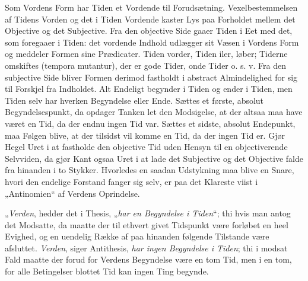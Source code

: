 \documentclass[12pt,a4paper]{book}
\begin{document}
Som Vordens Form har Tiden et Vordende til Forudsætning.
Vexelbestemmelsen af Tidens Vorden og det i Tiden Vordende kaster Lys
paa Forholdet mellem det Objective og det Subjective. Fra den
objective Side gaaer Tiden i Eet med det, som foregaaer i Tiden: det
vordende Indhold udlægger sit Væsen i Vordens Form og meddeler Formen
sine Prædicater. Tiden vorder, Tiden iler, løber; Tiderne omskiftes
(tempora mutantur), der er gode Tider, onde Tider o. s. v. Fra den
subjective Side bliver Formen derimod fastholdt i abstract
Almindelighed for sig til Forskjel fra Indholdet. Alt Endeligt
begynder i Tiden og ender i Tiden, men Tiden selv har hverken
Begyndelse eller Ende. Sættes et første, absolut Begyndelsespunkt, da
opdager Tanken let den Modsigelse, at der altsaa maa have været en Tid,
da der endnu ingen Tid var. Sættes et sidste, absolut Endepunkt, maa
Følgen blive, at der tilsidst vil komme en Tid, da der ingen Tid er.
Gjør Hegel Uret i at fastholde den objective Tid uden Hensyn til en
objectiverende Selvviden, da gjør Kant ogsaa Uret i at lade det
Subjective og det Objective falde fra hinanden i to Stykker. Hvorledes
en saadan Udstykning maa blive en Snare, hvori den endelige Forstand
fanger sig selv, er paa det Klareste viist i „Antinomien“ af Verdens
Oprindelse.

„\emph{Verden}, hedder det i Thesis, „\emph{har en Begyndelse i
Tiden}“; thi hvis man antog det Modsatte, da maatte der til ethvert
givet Tidspunkt være forløbet en heel Evighed, og en uendelig Række af
paa hinanden følgende Tilstande være afsluttet. \emph{Verden}, siger
Antithesis, \emph{har ingen Begyndelse i Tiden}; thi i modsat Fald
maatte der forud for Verdens Begyndelse være en tom Tid, men i en tom,
for alle Betingelser blottet Tid kan ingen Ting begynde.
\end{document}

